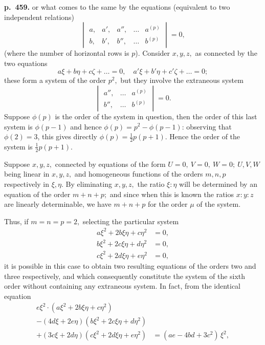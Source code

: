 \documentclass[11pt]{article}
\begin{document}
\bigskip
\noindent\textbf{p.~459.} or what comes to the same by the equations (equivalent to two independent relations)
\[ \begin{vmatrix} a,&a',&a'',&\ldots&a^{(p)}\\ b,&b',&b'',&\ldots&b^{(p)} \end{vmatrix} = 0, \]
(where the number of horizontal rows is $p$). Consider $x, y, z,$ as connected by the two equations
\[ a\xi + b\eta + c\zeta + \ldots = 0,\quad a'\xi + b'\eta + c'\zeta + \ldots = 0; \]
these form a system of the order $p^2,$ but they involve the extraneous system
\[ \begin{vmatrix} a'',&\ldots&a^{(p)}\\ b'',&\ldots&b^{(p)} \end{vmatrix} = 0. \]
Suppose $\phi(p)$ is the order of the system in question, then the order of this last system is $\phi(p - 1)$ and hence $\phi(p) = p^2 - \phi(p - 1)$: observing that $\phi(2) = 3$, this gives directly $\phi(p) = \tfrac{1}{2}p(p + 1)$. Hence the order of the system is $\tfrac{1}{2}p(p + 1)$.

Suppose $x, y, z,$ connected by equations of the form $U = 0,\ V = 0,\ W = 0;\ U, V, W$ being linear in $x, y, z,$ and homogeneous functions of the orders $m, n, p$ respectively in $\xi, \eta$. By eliminating $x, y, z,$ the ratio $\xi : \eta$ will be determined by an equation of the order $m + n + p;$ and since when this is known the ratios $x:y:z$ are linearly determinable, we have $m + n + p$ for the order $\mu$ of the system.

Thus, if $m = n = p = 2,$ selecting the particular system
\[
\begin{aligned}
a\xi^2 + 2b\xi\eta + c\eta^2 &= 0,\\
b\xi^2 + 2c\xi\eta + d\eta^2 &= 0,\\
c\xi^2 + 2d\xi\eta + e\eta^2 &= 0,
\end{aligned}
\]
it is possible in this case to obtain two resulting equations of the orders two and three respectively, and which consequently constitute the system of the sixth order without containing any extraneous system. In fact, from the identical equation
\[
\begin{aligned}
e\xi^2 \cdot (a\xi^2 + 2b\xi\eta + c\eta^2) &\\
- (4d\xi + 2e\eta)(b\xi^2 + 2c\xi\eta + d\eta^2) &\\
+ (3c\xi + 2d\eta)(c\xi^2 + 2d\xi\eta + e\eta^2) &= (ae - 4bd + 3c^2)\,\xi^2,
\end{aligned}
\]
\end{document}
